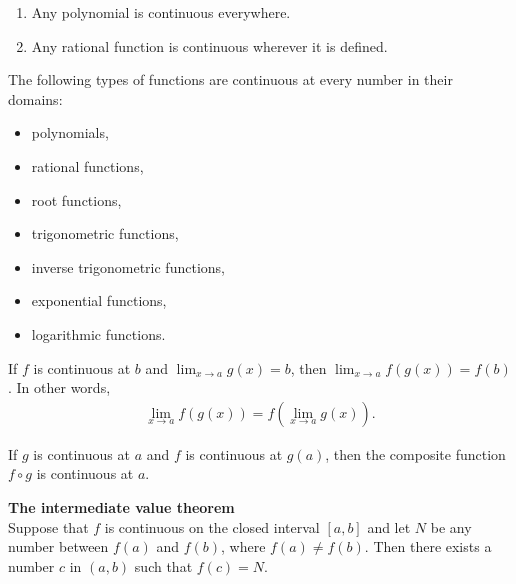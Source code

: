 \documentclass{article}
\begin{document}
\begin{theorem}
    \begin{enumerate}
        \item Any polynomial is continuous everywhere.
        \item Any rational function is continuous wherever it is defined.
    \end{enumerate}
\end{theorem}
\begin{theorem}
    The following types of functions are continuous at every number in their domains:
    \begin{itemize}
        \item polynomials,
        \item rational functions,
        \item root functions,
        \item trigonometric functions,
        \item inverse trigonometric functions,
        \item exponential functions,
        \item logarithmic functions.
    \end{itemize}
\end{theorem}
\begin{theorem}
    If $f$ is continuous at $b$ and $\lim_{x\to a}g(x) = b$, then $\lim_{x\to a}f(g(x))=f(b)$. In other words,
    \begin{align*}
        \lim_{x\to a}f(g(x))=f\left(\lim_{x\to a}g(x)\right).
    \end{align*}
\end{theorem}
\begin{theorem}
    If $g$ is continuous at $a$ and $f$ is continuous at $g(a)$, then the composite function $f\circ g$ is continuous at $a$.
\end{theorem}
\begin{theorem}
    \textbf{The intermediate value theorem}\\
    Suppose that $f$ is continuous on the closed interval $[a,b]$ and let $N$ be any number between $f(a)$ and $f(b)$, where $f(a)\not=f(b)$. Then there exists a number $c$ in $(a,b)$ such that $f(c)=N$.
\end{theorem}
\end{document}
